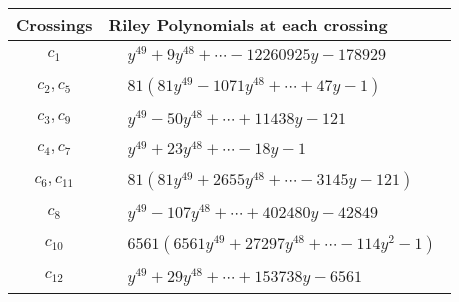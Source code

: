\documentclass[1p]{elsarticle_modified}
\theoremstyle{definition}
\begin{document}
\begin{tabular}{m{50pt}|m{274pt}}
Crossings & \hspace{64pt}Riley Polynomials at each crossing \\
\hline $$\begin{aligned}c_{1}\end{aligned}$$&$\begin{aligned}
&y^{49}+9 y^{48}+\cdots-12260925 y-178929
\end{aligned}$\\
\hline $$\begin{aligned}c_{2},c_{5}\end{aligned}$$&$\begin{aligned}
&81(81 y^{49}-1071 y^{48}+\cdots+47 y-1)
\end{aligned}$\\
\hline $$\begin{aligned}c_{3},c_{9}\end{aligned}$$&$\begin{aligned}
&y^{49}-50 y^{48}+\cdots+11438 y-121
\end{aligned}$\\
\hline $$\begin{aligned}c_{4},c_{7}\end{aligned}$$&$\begin{aligned}
&y^{49}+23 y^{48}+\cdots-18 y-1
\end{aligned}$\\
\hline $$\begin{aligned}c_{6},c_{11}\end{aligned}$$&$\begin{aligned}
&81(81 y^{49}+2655 y^{48}+\cdots-3145 y-121)
\end{aligned}$\\
\hline $$\begin{aligned}c_{8}\end{aligned}$$&$\begin{aligned}
&y^{49}-107 y^{48}+\cdots+402480 y-42849
\end{aligned}$\\
\hline $$\begin{aligned}c_{10}\end{aligned}$$&$\begin{aligned}
&6561(6561 y^{49}+27297 y^{48}+\cdots-114 y^2-1)
\end{aligned}$\\
\hline $$\begin{aligned}c_{12}\end{aligned}$$&$\begin{aligned}
&y^{49}+29 y^{48}+\cdots+153738 y-6561
\end{aligned}$\\
\hline
\end{tabular}\\~\\
\end{document}
